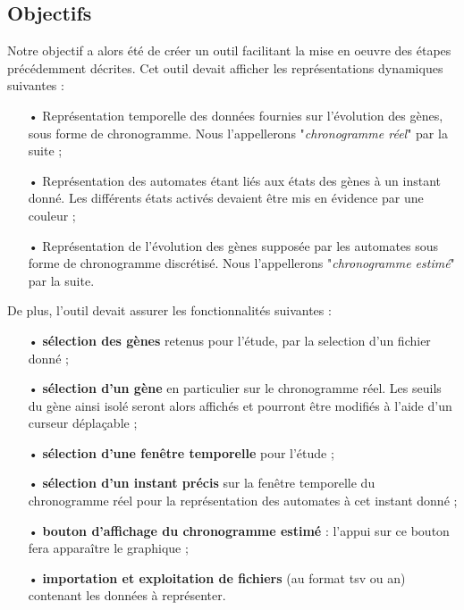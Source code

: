 \subsection{Objectifs}
Notre objectif a alors été de créer un outil facilitant la mise en oeuvre des étapes précédemment décrites. Cet outil devait afficher les représentations dynamiques suivantes :
\begin{itemize}[leftmargin=1.5cm]
    \item[•] Représentation temporelle des données fournies sur l'évolution des gènes, sous forme de chronogramme. Nous l'appellerons "\textit{chronogramme réel}" par la suite ;
    \item[•] Représentation des automates étant liés aux états des gènes à un instant donné. Les différents états activés devaient être mis en évidence par une couleur ; 
    \item[•] Représentation de l'évolution des gènes supposée par les automates sous forme de chronogramme discrétisé. Nous l'appellerons "\textit{chronogramme estimé}" par la suite.
\end{itemize}
\bigbreak
\noindent De plus, l'outil devait assurer les fonctionnalités suivantes :

\begin{itemize}[leftmargin=1.5cm]


\item[•]\textbf{sélection des gènes} retenus pour l'étude, par la selection d'un fichier donné  ;

\item[•]\textbf{sélection d'un gène} en particulier sur le chronogramme réel. Les seuils du gène ainsi isolé seront alors affichés et pourront être modifiés à l'aide d'un curseur déplaçable ;

\item[•]\textbf{sélection d'une fenêtre temporelle} pour l'étude ;

\item[•]\textbf{sélection d'un instant précis} sur la fenêtre temporelle du chronogramme réel pour la représentation des automates à cet instant donné ; 

\item[•]\textbf{bouton d'affichage du chronogramme estimé} : l'appui sur ce bouton fera apparaître le graphique ;

\item[•]\textbf{importation et exploitation de fichiers} (au format tsv ou an) contenant les données à représenter.

\end{itemize}
\bigbreak
\bigbreak
